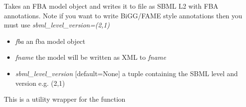 \documentclass[a4paper,11pt,english]{sphinxmanual}
\begin{document}
\begin{fulllineitems}
\label{modules_doc:cbmpy.CBWrite.writeSBML2FBA}
Takes an FBA model object and writes it to file as SBML L2 with FBA annotations.
Note if you want to write BiGG/FAME style annotations then you must use \emph{sbml\_level\_version=(2,1)}
\begin{itemize}
\item {} 
\emph{fba} an fba model object

\item {} 
\emph{fname} the model will be written as XML to \emph{fname}

\item {} 
\emph{sbml\_level\_version} {[}default=None{]} a tuple containing the SBML level and version e.g. (2,1)

\end{itemize}

This is a utility wrapper for the function 

\end{fulllineitems}

\end{document}

